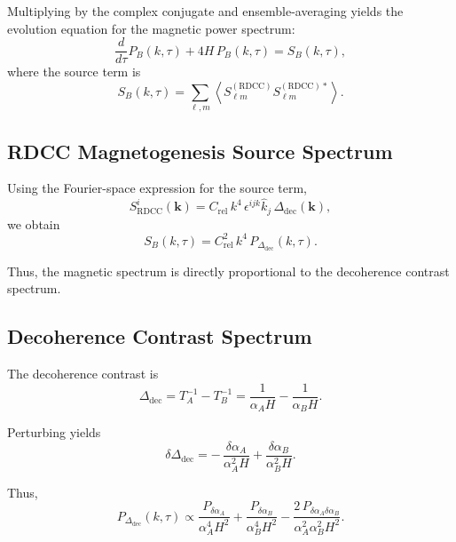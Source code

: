 \documentclass[11pt,a4paper]{article}
\begin{document}
Multiplying by the complex conjugate and ensemble-averaging yields the evolution equation
for the magnetic power spectrum:
\begin{equation}
\frac{d}{d\tau} P_{B}(k,\tau)
+
4H\,P_{B}(k,\tau)
=
S_{B}(k,\tau),
\label{eq:PB_evol}
\end{equation}
where the source term is
\begin{equation}
S_{B}(k,\tau)
=
\sum_{\ell,m}
\left\langle
S_{\ell m}^{(\mathrm{RDCC})}
S_{\ell m}^{(\mathrm{RDCC})*}
\right\rangle.
\end{equation}

\subsection{RDCC Magnetogenesis Source Spectrum}

Using the Fourier-space expression for the source term,
\begin{equation}
S_{\mathrm{RDCC}}^{i}(\mathbf{k})
=
C_{\mathrm{rel}}\,k^{4}\,
\epsilon^{ijk}\hat{k}_{j}\,
\Delta_{\mathrm{dec}}(\mathbf{k}),
\end{equation}
we obtain
\begin{equation}
S_{B}(k,\tau)
=
C_{\mathrm{rel}}^{2}\,
k^{4}\,
P_{\Delta_{\mathrm{dec}}}(k,\tau).
\label{eq:SB}
\end{equation}

Thus, the magnetic spectrum is directly proportional to the decoherence contrast spectrum.

\subsection{Decoherence Contrast Spectrum}

The decoherence contrast is
\begin{equation}
\Delta_{\mathrm{dec}}
=
T_{A}^{-1}
-
T_{B}^{-1}
=
\frac{1}{\alpha_{A}H}
-
\frac{1}{\alpha_{B}H}.
\end{equation}

Perturbing yields
\begin{equation}
\delta\Delta_{\mathrm{dec}}
=
-\,\frac{\delta\alpha_{A}}{\alpha_{A}^{2}H}
+
\frac{\delta\alpha_{B}}{\alpha_{B}^{2}H}.
\end{equation}

Thus,
\begin{equation}
P_{\Delta_{\mathrm{dec}}}(k,\tau)
\propto
\frac{P_{\delta\alpha_{A}}}{\alpha_{A}^{4}H^{2}}
+
\frac{P_{\delta\alpha_{B}}}{\alpha_{B}^{4}H^{2}}
-
\frac{2\,P_{\delta\alpha_{A}\delta\alpha_{B}}}{\alpha_{A}^{2}\alpha_{B}^{2}H^{2}}.
\label{eq:Pdec}
\end{equation}
\end{document}
